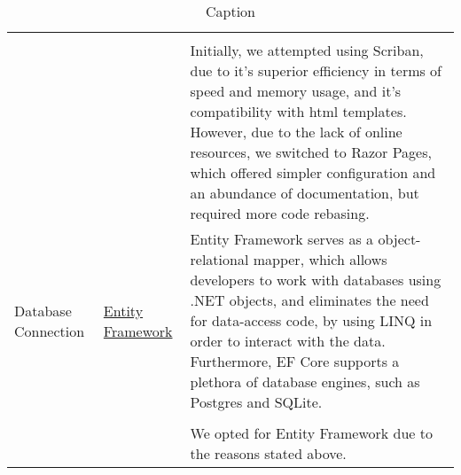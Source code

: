 \begin{table}[h]
\begin{tabular}{|p{}|p{} | p{}|}
         && \\
         && Initially, we attempted using Scriban, due to it's superior efficiency in terms of speed and memory usage, and it's compatibility with html templates. However, due to the lack of online resources, we switched to Razor Pages, which offered simpler configuration and an abundance of documentation, but required more code rebasing.\\
         \hline
         Database Connection & \href{https://learn.microsoft.com/en-us/ef/core/}{Entity Framework} & Entity Framework serves as a object-relational mapper, which allows developers to work with databases using .NET objects, and eliminates the need for data-access code, by using LINQ in order to interact with the data. Furthermore, EF Core supports a plethora of database engines, such as Postgres and SQLite.\\
         &&\\
         && We opted for Entity Framework due to the reasons stated above.\\
         \hline
    \end{tabular}
    \caption{Caption}
    \label{tab:tools1}
\end{table}
